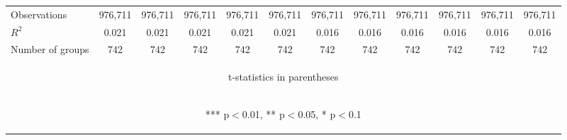 \documentclass[]{article}
\begin{document}
\begin{center}
\begin{tabular}{lccccccccccc}
        Observations     & 976,711                                        & 976,711                                        & 976,711                                        & 976,711                                        & 976,711                                        & 976,711                                         & 976,711                                         & 976,711                                        & 976,711                                        & 976,711                                        & 976,711                                        \\
        $R^2$            & 0.021                                          & 0.021                                          & 0.021                                          & 0.021                                          & 0.021                                          & 0.016                                           & 0.016                                           & 0.016                                          & 0.016                                          & 0.016                                          & 0.016                                          \\
        Number of groups & 742                                            & 742                                            & 742                                            & 742                                            & 742                                            & 742                                             & 742                                             & 742                                            & 742                                            & 742                                            & 742                                            \\ \hline
        \multicolumn{12}{c}{\begin{footnotesize} t-statistics in parentheses\end{footnotesize}}                                                                                                                                                                                                                                                                                                                                                                                                                                                                                       \\
        \multicolumn{12}{c}{\begin{footnotesize} *** p$<$0.01, ** p$<$0.05, * p$<$0.1\end{footnotesize}}                                                                                                                                                                                                                                                                                                                                                                                                                                                                              \\
    \end{tabular}
\end{center}
\end{document}
